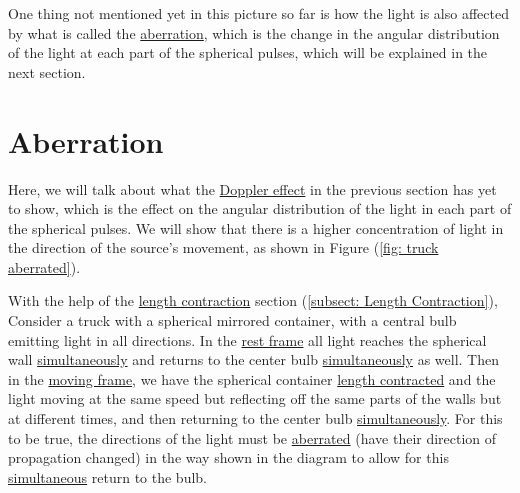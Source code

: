 One thing not mentioned yet in this picture so far is how the light is also affected by what is called the \hyperlink{def-aberration}{aberration}, which is the change in the angular distribution of the light at each part of the spherical pulses, which will be explained in the next section.

\section{Aberration} \label{sect: Aberration}

Here, we will talk about what the \hyperlink{def-doppler-effect}{Doppler effect} in the previous section has yet to show, which is the effect on the angular distribution of the light in each part of the spherical pulses.
We will show that there is a higher concentration of light in the direction of the source's movement, as shown in Figure (\ref{fig: truck aberrated}).

With the help of the \hyperlink{def-length-contraction}{length contraction} section (\ref{subsect: Length Contraction}), Consider a truck with a spherical mirrored container, with a central bulb emitting light in all directions.
In the \hyperlink{def-proper-frame}{rest frame} all light reaches the spherical wall \hyperlink{def-simultaneity}{simultaneously} and returns to the center bulb \hyperlink{def-simultaneity}{simultaneously} as well.
Then in the \hyperlink{def-Moving-Frame}{moving frame}, we have the spherical container \hyperlink{def-length-contraction}{length contracted} and the light moving at the same speed but reflecting off the same parts of the walls but at different times, and then returning to the center bulb \hyperlink{def-simultaneity}{simultaneously}.
For this to be true, the directions of the light must be \hyperlink{def-aberration}{aberrated} (have their direction of propagation changed) in the way shown in the diagram to allow for this \hyperlink{def-simultaneity}{simultaneous} return to the bulb.

